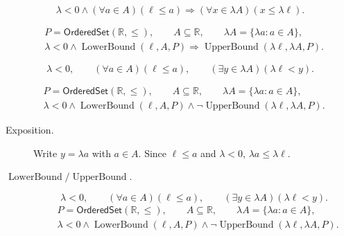 \begin{remark*}
\[
\lambda<0\land(\forall a\in A)(\ell\leq a)
\Longrightarrow
(\forall x\in\lambda A)(x\leq\lambda\ell).
\]
\end{remark*}

\begin{remark*}
\[
\begin{aligned}
&P=\mathsf{OrderedSet}(\mathbb{R},\leq),\qquad
A\subseteq\mathbb{R},\qquad \lambda A=\{\lambda a:a\in A\},\\
&\lambda<0\land\operatorname{LowerBound}(\ell,A,P)
\Longrightarrow\operatorname{UpperBound}(\lambda\ell,\lambda A,P).
\end{aligned}
\]
\end{remark*}

\begin{remark*}
\[
\lambda<0,\qquad(\forall a\in A)(\ell\leq a),\qquad
(\exists y\in\lambda A)(\lambda\ell<y).
\]
\end{remark*}

\begin{remark*}
\[
\begin{aligned}
&P=\mathsf{OrderedSet}(\mathbb{R},\leq),\qquad
A\subseteq\mathbb{R},\qquad \lambda A=\{\lambda a:a\in A\},\\
&\lambda<0\land\operatorname{LowerBound}(\ell,A,P)\land
\neg\operatorname{UpperBound}(\lambda\ell,\lambda A,P).
\end{aligned}
\]
\end{remark*}

\begin{remark*}
\begin{description}
\item[Exposition.]
Write $y=\lambda a$ with $a\in A$.  Since $\ell\leq a$ and $\lambda<0$,
$\lambda a\leq\lambda\ell$.


  \item[\(\operatorname{LowerBound} / \operatorname{UpperBound}.\)]
  \[
\lambda<0,\qquad(\forall a\in A)(\ell\leq a),\qquad
(\exists y\in\lambda A)(\lambda\ell<y).
\]
\[
\begin{aligned}
&P=\mathsf{OrderedSet}(\mathbb{R},\leq),\qquad
A\subseteq\mathbb{R},\qquad \lambda A=\{\lambda a:a\in A\},\\
&\lambda<0\land\operatorname{LowerBound}(\ell,A,P)\land
\neg\operatorname{UpperBound}(\lambda\ell,\lambda A,P).
\end{aligned}
\]
\end{description}
\end{remark*}


